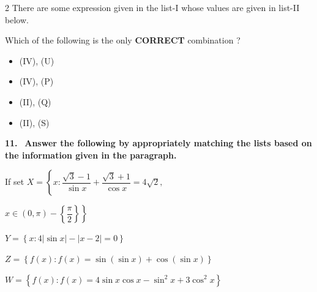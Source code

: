 \documentclass[10pt]{extarticle}
\newcommand{\qn}[1]{\par\smallskip\noindent\textbf{#1.}~}
\newenvironment{qoptions}{\begin{itemize}[leftmargin=1.8em,itemsep=1pt,topsep=2pt,label={}]}{\end{itemize}}
\newcommand{\opt}[2]{\item[(#1)] #2}
\begin{document}
\begin{multicols}{2}
There are some expression given in the list-I whose values are given in list-II below.\par
\smallskip
{}\par
Which of the following is the only \textbf{CORRECT} combination ?
\begin{qoptions}
\opt{A}{(IV), (U)}
\opt{B}{(IV), (P)}
\opt{C}{(II), (Q)}
\opt{D}{(II), (S)}
\end{qoptions}
\qn{11} \textbf{Answer the following by appropriately matching the lists based on the information given in the paragraph.}\par
If set $X=\left\{x:\dfrac{\sqrt3-1}{\sin x}+\dfrac{\sqrt3+1}{\cos x}=4\sqrt2,\right.$\par $\left.x\in(0,\pi)-\left\{\dfrac\pi2\right\}\right\}$\par
$Y=\left\{x:4|\sin x|-|x-2|=0\right\}$\par
$Z=\left\{f(x):f(x)=\sin(\sin x)+\cos(\sin x)\right\}$\par
$W=\left\{f(x):f(x)=4\sin x\cos x-\sin^2x+3\cos^2x\right\}$\par
\smallskip
{}
\end{multicols}
\end{document}
